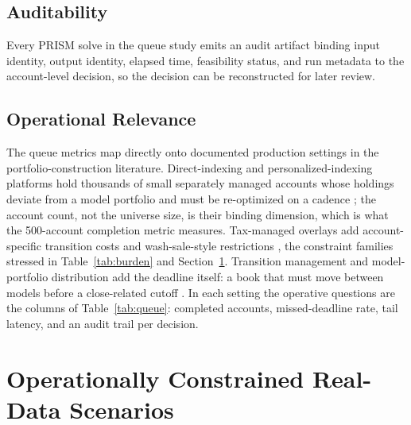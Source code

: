\documentclass[10pt,a4paper]{extarticle}
\begin{document}
\subsection{Auditability}

Every PRISM solve in the queue study emits an audit artifact binding input
identity, output identity, elapsed time, feasibility status, and run metadata
to the account-level decision, so the decision can be reconstructed for later
review.

\subsection{Operational Relevance}

The queue metrics map directly onto documented production settings in the
portfolio-construction literature. Direct-indexing and personalized-indexing
platforms hold thousands of small separately managed accounts whose holdings
deviate from a model portfolio and must be re-optimized on a cadence
\citep{khang2022}; the account count, not the universe size, is their binding
dimension, which is what the 500-account completion metric measures.
Tax-managed overlays add account-specific transition costs and wash-sale-style
restrictions \citep{stein2017,moehle2021taxaware}, the constraint families
stressed in Table~\ref{tab:burden} and Section~\ref{sec:sanity}. Transition
management and model-portfolio distribution add the deadline itself: a book
that must move between models before a close-related cutoff
\citep{harvey2025rebalancing,nasdaqclose}. In each setting the operative
questions are the columns of Table~\ref{tab:queue}: completed accounts,
missed-deadline rate, tail latency, and an audit trail per decision.

\section{Operationally Constrained Real-Data Scenarios}
\label{sec:sanity}
\end{document}
